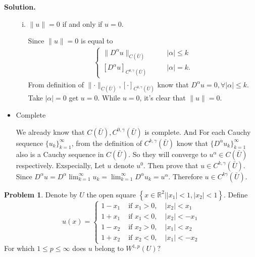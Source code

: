 \documentclass[a4paper]{book}
\newenvironment{solution}%
{\noindent\textbf{Solution.}}%
{\qedhere}
\numberwithin{equation}{chapter}
\theoremstyle{definition}
\newtheorem{pro}[exm]{Problem}
\begin{document}
\begin{solution}
\begin{itemize}
\begin{enumerate}[(i)]
    \item $\lVert u \rVert = 0$ if and only if $u = 0$.

      Since $\lVert u \rVert = 0$ is equal to
      \begin{align*}
        \begin{cases}
          \lVert D^\alpha u\rVert_{C(\bar{U})} \qquad &\left| \alpha \right| \leq k \\
          \left[ D^\alpha u \right]_{C^{0,\gamma}(\bar{U})} \qquad &\left| \alpha \right| = k .
        \end{cases}
      \end{align*}
      From definition of $\lVert \cdot \rVert_{C(\bar{U})}, \left[ \cdot \right]_{C^{0,\gamma}(\bar{U})}$ know that $D^\alpha u = 0, \forall \left| \alpha \right| \leq k$. Take $\left| \alpha \right| = 0$ get $u = 0$. While $u = 0$, it's clear that $\lVert u \rVert = 0$.
    \end{enumerate}

  \item Complete

    We already know that $C(\bar{U}), C^{0,\gamma}(\bar{U})$ is complete. And For each Cauchy sequence $\{u_k\}_{k=1}^\infty$, from the definition of $C^{k,\gamma}(\bar{U})$ know that $\{D^\alpha u_k\}_{k= 1}^\infty$ also is a Cauchy sequence in $C(\bar{U})$. So they will converge to $u^\alpha \in C(\bar{U})$ respectively. Exspecially, Let $u$ denote $u^0$. Then prove that $u \in C^{k,\gamma}(\bar{U})$. Since $D^\alpha u = D^\alpha \lim_{k = 1}^\infty u_k = \lim_{k =1}^\infty D^\alpha u_k = u^\alpha$. Therefore $u \in C^{k\gamma}(\bar{U})$.
  \end{itemize}
\end{solution}


\begin{pro}
  Denote by $U$ the open square $\left\{x \in \mathbb{R}^{2}\big|| x_{1}|<1,| x_{2} |<1\right\} .$ Define
  \[
    u(x)=\left\{\begin{array}{ll}
                  1-x_{1} & \text { if } x_{1}>0, \quad\left|x_{2}\right|<x_{1} \\
                  1+x_{1} & \text { if } x_{1}<0, \quad\left|x_{2}\right|<-x_{1} \\
                  1-x_{2} & \text { if } x_{2}>0, \quad\left|x_{1}\right|<x_{2} \\
                  1+x_{2} & \text { if } x_{2}<0, \quad\left|x_{1}\right|<-x_{2}
                \end{array}\right.
            \]
            For which $1 \leq p \leq \infty$ does $u$ belong to $W^{1, p}(U) ?$
\end{pro}
\end{document}
